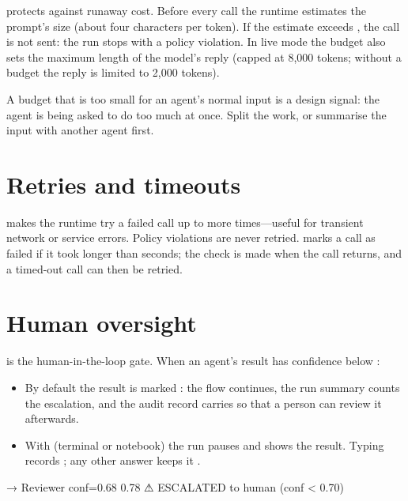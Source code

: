  protects against runaway cost. Before every call the runtime estimates the prompt's size (about four characters per token). If the estimate exceeds , the call is not sent: the run stops with a policy violation. In live mode the budget also sets the maximum length of the model's reply (capped at 8,000 tokens; without a budget the reply is limited to 2,000 tokens).

\begin{tip}
A budget that is too small for an agent's normal input is a design signal: the agent is being asked to do too much at once. Split the work, or summarise the input with another agent first.
\end{tip}

\section{Retries and timeouts}

 makes the runtime try a failed call up to  more times---useful for transient network or service errors. Policy violations are never retried.  marks a call as failed if it took longer than  seconds; the check is made when the call returns, and a timed-out call can then be retried.

\section{Human oversight}

 is the human-in-the-loop gate. When an agent's result has confidence below :

\begin{itemize}
  \item By default the result is marked : the flow continues, the run summary counts the escalation, and the audit record carries  so that a person can review it afterwards.
  \item With  (terminal or notebook) the run pauses and shows the result. Typing  records ; any other answer keeps it .
\end{itemize}

\begin{terminal}
  → Reviewer           conf=0.68  0.78  ⚠ ESCALATED to human (conf < 0.70)
\end{terminal}

